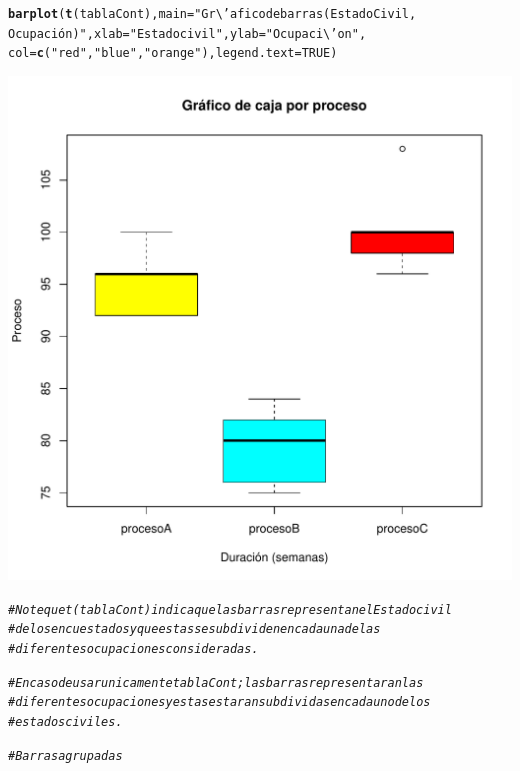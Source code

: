 \documentclass[12pt,letterpaper]{article}\usepackage[]{graphicx}\usepackage[]{color}
\makeatletter
\def\maxwidth{ %
  \ifdim\Gin@nat@width>\linewidth
    \linewidth
  \else
    \Gin@nat@width
  \fi
}
\newcommand{\hlnum}[1]{\textcolor[rgb]{0.686,0.059,0.569}{#1}}%
\newcommand{\hlstr}[1]{\textcolor[rgb]{0.192,0.494,0.8}{#1}}%
\newcommand{\hlcom}[1]{\textcolor[rgb]{0.678,0.584,0.686}{\textit{#1}}}%
\newcommand{\hlstd}[1]{\textcolor[rgb]{0.345,0.345,0.345}{#1}}%
\newcommand{\hlkwc}[1]{\textcolor[rgb]{0.333,0.667,0.333}{#1}}%
\newcommand{\hlkwd}[1]{\textcolor[rgb]{0.737,0.353,0.396}{\textbf{#1}}}%
\newenvironment{kframe}{%
 \def\at@end@of@kframe{}%
 \ifinner\ifhmode%
  \def\at@end@of@kframe{\end{minipage}}%
  \begin{minipage}{\columnwidth}%
 \fi\fi%
 \def\FrameCommand##1{\hskip\@totalleftmargin \hskip-\fboxsep
 \colorbox{shadecolor}{##1}\hskip-\fboxsep
     \hskip-\linewidth \hskip-\@totalleftmargin \hskip\columnwidth}%
 \MakeFramed {\advance\hsize-\width
   \@totalleftmargin\z@ \linewidth\hsize
   \@setminipage}}%
 {\par\unskip\endMakeFramed%
 \at@end@of@kframe}
\newenvironment{knitrout}{}{} %
\makeatother
\begin{document}
\begin{enumerate}
\begin{knitrout}
\begin{kframe}
\begin{alltt}
\hlkwd{barplot}\hlstd{(}\hlkwd{t}\hlstd{(tablaCont),} \hlkwc{main}\hlstd{=}\hlstr{"Gr\textbackslash{}'afico de barras (Estado Civil, 
        Ocupación)"}\hlstd{,} \hlkwc{xlab}\hlstd{=}\hlstr{"Estado civil"}\hlstd{,} \hlkwc{ylab}\hlstd{=}\hlstr{"Ocupaci\textbackslash{}'on"}\hlstd{,}
        \hlkwc{col}\hlstd{=}\hlkwd{c}\hlstd{(}\hlstr{"red"}\hlstd{,} \hlstr{"blue"}\hlstd{,} \hlstr{"orange"}\hlstd{),} \hlkwc{legend.text}\hlstd{=}\hlnum{TRUE}\hlstd{)}
\end{alltt}
\end{kframe}
\includegraphics[width=\maxwidth]{figure/unnamed-chunk-11-1} 
\begin{kframe}\begin{alltt}
\hlcom{# Note que t(tablaCont) indica que las barras representan el Estado civil}
\hlcom{# de los encuestados y que estas se subdividen en cada una de las }
\hlcom{# diferentes ocupaciones consideradas.}

\hlcom{# En caso de usar unicamente tablaCont; las barras representaran las}
\hlcom{# diferentes ocupaciones y estas estaran subdividas en cada uno de los}
\hlcom{# estados civiles. }
\end{alltt}
\end{kframe}
\end{knitrout}

\begin{knitrout}
\color{fgcolor}\begin{kframe}
\begin{alltt}
\hlcom{# Barras agrupadas}


\end{alltt}
\end{kframe}
\end{knitrout}
\end{enumerate}
\end{document}
